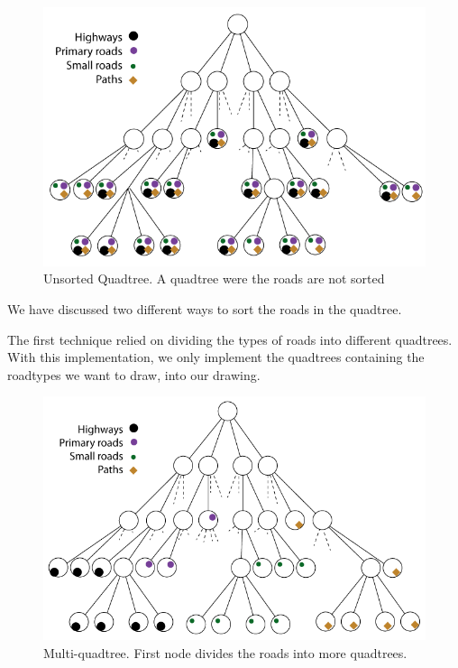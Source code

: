 \begin{figure}[h!]
\centering
\includegraphics[width=1\linewidth]{images/UnsortedQuadtree.png}
\caption{Unsorted Quadtree. A quadtree were the roads are not sorted}
\label{IMPL-USQ}
\end{figure}

We have discussed two different ways to sort the roads in the quadtree. 

The first technique relied on dividing the types of roads into different quadtrees.
With this implementation, we only implement the quadtrees containing the roadtypes 
we want to draw, into our drawing.

\begin{figure}[h!]
\centering
\includegraphics[width=1\linewidth]{images/MultiQuadtree.png}
\caption{Multi-quadtree. First node divides the roads into more
quadtrees.}
\label{IMPL-DCQ}
\end{figure}

